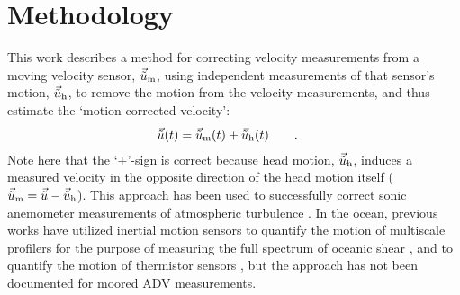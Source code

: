 
\section{Methodology}
\label{sec:methods}


\def\ue{\ensuremath{\vec{\tilde{u}}\earth}}
\def\nrot{\ensuremath{\vec{n}_{\omega}}}
\def\nacc{\ensuremath{\vec{n}_{a}}}


This work describes a method for correcting velocity measurements from a moving velocity sensor, $\umeas$, using independent measurements of that sensor's motion, $\uhead$, to remove the motion from the velocity measurements, and thus estimate the `motion corrected velocity':
\begin{align}
  \label{eqn:u_mot_def}
  \ue(t) & = \umeas(t) + \uhead(t) \qquad .
\end{align}
Note here that the `+'-sign is correct because head motion, $\uhead$, induces a measured velocity in the opposite direction of the head motion itself ($\umeas = \ue - \uhead$). This approach has been used to successfully correct sonic anemometer measurements of atmospheric turbulence \cite[e.g., ][]{Edson++1998, Miller++2008}.  In the ocean, previous works have utilized inertial motion sensors to quantify the motion of multiscale profilers for the purpose of measuring the full spectrum of oceanic shear \cite[]{Winkel++1996}, and to quantify the motion of thermistor sensors \cite[]{Moum+Nash2009b}, but the \cite{Edson++1998} approach has not been documented for moored ADV measurements.

